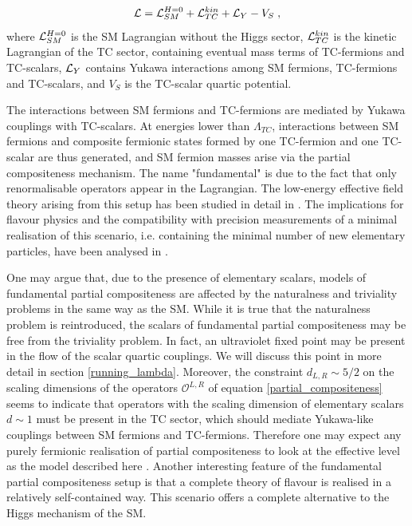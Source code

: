 \begin{equation}
\mathcal L = \mathcal L_{SM}^{H=0} + \mathcal L_{TC}^{kin} + \mathcal L_Y -V_S \; ,
\end{equation}
%
where $\mathcal L_{SM}^{H=0}$ is the SM Lagrangian without the  Higgs sector, $\mathcal L_{TC}^{kin}$ is the kinetic Lagrangian of the TC sector, containing eventual mass terms of TC-fermions and TC-scalars, $ \mathcal L_Y$ contains Yukawa interactions among SM fermions, TC-fermions and TC-scalars, and $V_S$ is the TC-scalar quartic potential.

The interactions between SM fermions and TC-fermions are mediated by Yukawa couplings with TC-scalars. At energies lower than $\Lambda_{TC}$,  interactions between SM fermions and composite fermionic states formed by one TC-fermion and one TC-scalar are thus generated, and  SM fermion masses arise via the partial compositeness mechanism. The name "fundamental" is due to the fact that only renormalisable operators appear in the Lagrangian.
The low-energy effective field theory arising from this setup has been studied in detail in \cite{Cacciapaglia:2017cdi}. The implications for flavour physics and the compatibility with precision measurements of a minimal realisation of this scenario, i.e. containing the minimal number of new elementary particles, have been analysed in \cite{Sannino:2017utc}. 

One may argue that, due to the presence of elementary scalars, models of fundamental partial compositeness are affected by the naturalness and triviality problems in the same way as the SM. While it is true that the naturalness problem is reintroduced, the scalars of fundamental partial compositeness may be free from the triviality problem. In fact, an ultraviolet fixed point may be present in the flow  of the scalar quartic couplings. We will discuss this point in more detail in section \ref{running_lambda}. Moreover, the constraint $d_{L,R} \sim 5/2$ on the scaling dimensions of the operators $\mathcal O^{L,R}$ of equation \ref{partial_compositeness} seems to indicate that operators with the scaling dimension of elementary scalars $d \sim 1$ must be present in the TC sector, which should mediate Yukawa-like couplings between SM fermions and TC-fermions. Therefore one may expect any purely fermionic realisation of partial compositeness to look at the effective level as the model described here \cite{Sannino:2016sfx} . Another interesting feature of the fundamental partial compositeness setup is that a complete theory of flavour is realised in a relatively self-contained way. This scenario offers a complete alternative to the Higgs mechanism of the SM.

